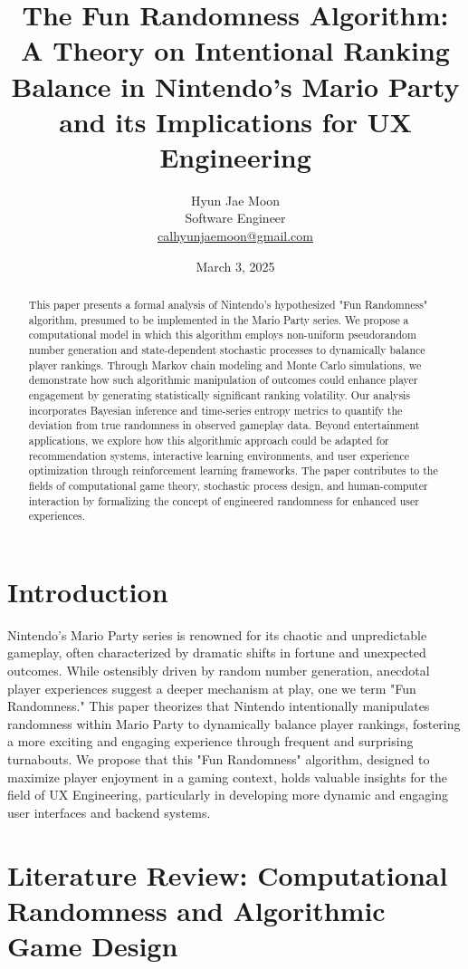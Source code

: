 \documentclass{article}
\title{The Fun Randomness Algorithm: A Theory on Intentional Ranking Balance in Nintendo's Mario Party and its Implications for UX Engineering}
\author{Hyun Jae Moon \\ \small Software Engineer \\ \small \href{mailto:calhyunjaemoon@gmail.com}{calhyunjaemoon@gmail.com}}
\date{March 3, 2025}
\begin{document}
\maketitle

\begin{abstract}
This paper presents a formal analysis of Nintendo's hypothesized "Fun Randomness" algorithm, presumed to be implemented in the Mario Party series. We propose a computational model in which this algorithm employs non-uniform pseudorandom number generation and state-dependent stochastic processes to dynamically balance player rankings. Through Markov chain modeling and Monte Carlo simulations, we demonstrate how such algorithmic manipulation of outcomes could enhance player engagement by generating statistically significant ranking volatility. Our analysis incorporates Bayesian inference and time-series entropy metrics to quantify the deviation from true randomness in observed gameplay data. Beyond entertainment applications, we explore how this algorithmic approach could be adapted for recommendation systems, interactive learning environments, and user experience optimization through reinforcement learning frameworks. The paper contributes to the fields of computational game theory, stochastic process design, and human-computer interaction by formalizing the concept of engineered randomness for enhanced user experiences.
\end{abstract}

\section{Introduction}

Nintendo's Mario Party series is renowned for its chaotic and unpredictable gameplay, often characterized by dramatic shifts in fortune and unexpected outcomes.  While ostensibly driven by random number generation, anecdotal player experiences suggest a deeper mechanism at play, one we term "Fun Randomness." This paper theorizes that Nintendo intentionally manipulates randomness within Mario Party to dynamically balance player rankings, fostering a more exciting and engaging experience through frequent and surprising turnabouts. We propose that this "Fun Randomness" algorithm, designed to maximize player enjoyment in a gaming context, holds valuable insights for the field of UX Engineering, particularly in developing more dynamic and engaging user interfaces and backend systems.

\section{Literature Review: Computational Randomness and Algorithmic Game Design}
\end{document}

